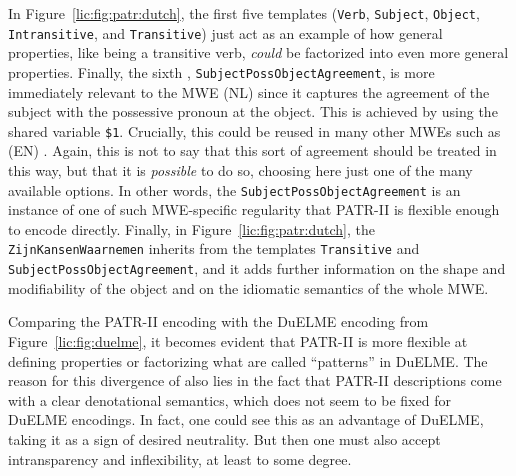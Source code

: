 \documentclass[output=paper]{langsci/langscibook}
\begin{document}
In Figure~\ref{lic:fig:patr:dutch}, the first five templates (\texttt{Verb}, \texttt{Subject}, \texttt{Object}, \texttt{Intransitive}, and \texttt{Transitive}) just act as an example of how general properties, like being a transitive verb, \textit{could} be factorized into even more general properties. Finally, the sixth , \texttt{SubjectPossObjectAgreement}, is more immediately relevant to the MWE (NL)  since it captures the agreement of the subject with the possessive pronoun at the object. This is achieved by using the shared variable \texttt{\$1}. Crucially, this  could be reused in many other MWEs such as (EN) . Again, this is not to say that this sort of agreement should be treated in this way, but that it is \textit{possible} to do so, choosing here just one of the many available options. In other words, the  \texttt{SubjectPossObjectAgreement} is an instance of one of such MWE-specific regularity that PATR-II is flexible enough to encode directly. Finally, in Figure~\ref{lic:fig:patr:dutch}, the  \texttt{ZijnKansenWaarnemen} inherits from the templates \texttt{Transitive} and \texttt{SubjectPossObjectAgreement}, and it adds further information on the shape and modifiability of the object and on the idiomatic semantics of the whole MWE.

Comparing the PATR-II encoding with the DuELME encoding from Figure~\ref{lic:fig:duelme}, it becomes evident that PATR-II is more flexible at defining properties or factorizing what are called ``patterns'' in DuELME. The reason for this divergence of  also lies in the fact that PATR-II descriptions come with a clear denotational semantics, which does not seem to be fixed for DuELME encodings. In fact, one could see this as an advantage of DuELME, taking it as a sign of desired neutrality. But then one must also accept intransparency and inflexibility, at least to some degree.
\end{document}
